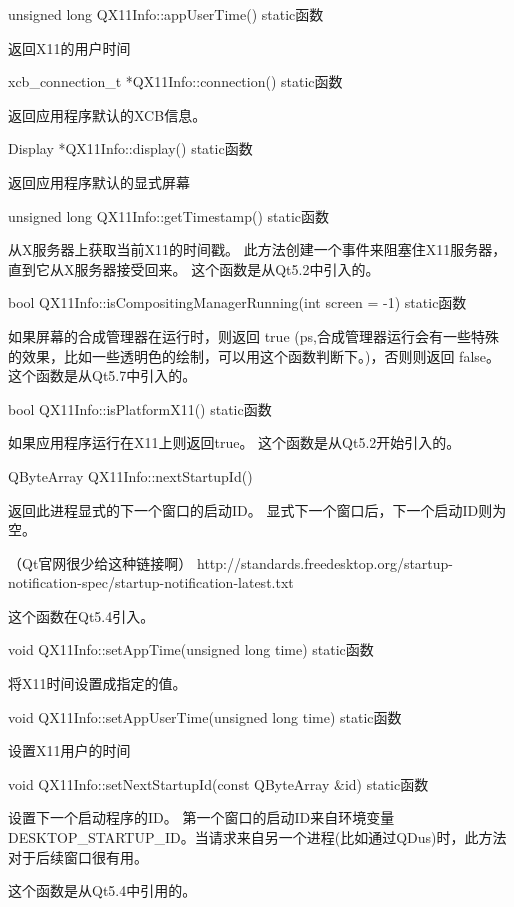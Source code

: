 unsigned long QX11Info::appUserTime() static函数

返回X11的用户时间

xcb\_connection\_t *QX11Info::connection() static函数

返回应用程序默认的XCB信息。

Display *QX11Info::display() static函数

返回应用程序默认的显式屏幕

unsigned long QX11Info::getTimestamp() static函数

从X服务器上获取当前X11的时间戳。 此方法创建一个事件来阻塞住X11服务器，直到它从X服务器接受回来。 这个函数是从Qt5.2中引入的。

bool QX11Info::isCompositingManagerRunning(int screen = -1) static函数

如果屏幕的合成管理器在运行时，则返回 true (ps,合成管理器运行会有一些特殊的效果，比如一些透明色的绘制，可以用这个函数判断下。)，否则则返回 false。 这个函数是从Qt5.7中引入的。

bool QX11Info::isPlatformX11() static函数

如果应用程序运行在X11上则返回true。 这个函数是从Qt5.2开始引入的。

QByteArray QX11Info::nextStartupId()

返回此进程显式的下一个窗口的启动ID。 显式下一个窗口后，下一个启动ID则为空。

（Qt官网很少给这种链接啊） http://standards.freedesktop.org/startup-notification-spec/startup-notification-latest.txt

这个函数在Qt5.4引入。

void QX11Info::setAppTime(unsigned long time) static函数

将X11时间设置成指定的值。

void QX11Info::setAppUserTime(unsigned long time) static函数

设置X11用户的时间

void QX11Info::setNextStartupId(const QByteArray \&id) static函数

设置下一个启动程序的ID。 第一个窗口的启动ID来自环境变量DESKTOP\_STARTUP\_ID。当请求来自另一个进程(比如通过QDus)时，此方法对于后续窗口很有用。

这个函数是从Qt5.4中引用的。





